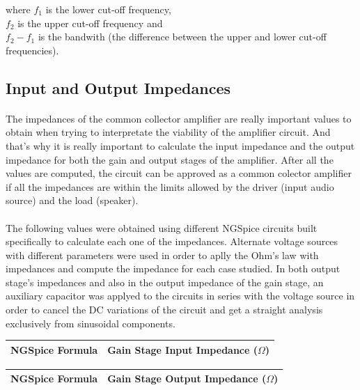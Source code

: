 where $f_1$ is the lower cut-off frequency,\\
$f_2$ is the upper cut-off frequency and\\
$f_2-f_1$ is the bandwith (the difference between the upper and lower cut-off frequencies).


\subsection{Input and Output Impedances}

\paragraph{}
The impedances of the common collector amplifier are really important values to obtain when trying to interpretate the viability of the amplifier circuit. And that's why it is really important to calculate the input impedance and the output impedance for both the gain and output stages of the amplifier. After all the values are computed, the circuit can be approved as a common colector amplifier if all the impedances are within the limits allowed by the driver (input audio source) and the load (speaker).

\paragraph{}
The following values were obtained using different NGSpice circuits built specifically to calculate each one of the impedances. Alternate voltage sources with different parameters were used in order to aplly the Ohm's law with impedances and compute the impedance for each case studied. In both output stage's impedances and also in the output impedance of the gain stage, an auxiliary capacitor was applyed to the circuits  in series with the voltage source in order to cancel the DC variations of the circuit and get a straight analysis exclusively from sinusoidal components.

\begin{table}[H] \centering
  \begin{tabular}{|l|r|}
    \hline    
    {\bf NGSpice Formula} & {\bf Gain Stage Input Impedance ($\Omega$)}\\ \hline
    
  \end{tabular}
 \label{tab:inputimp}
\end{table}

\begin{table}[H] \centering
  \begin{tabular}{|l|r|}
    \hline    
    {\bf NGSpice Formula} & {\bf Gain Stage Output Impedance ($\Omega$)}\\ \hline
    
  \end{tabular}
 \label{tab:outimp}
\end{table}

